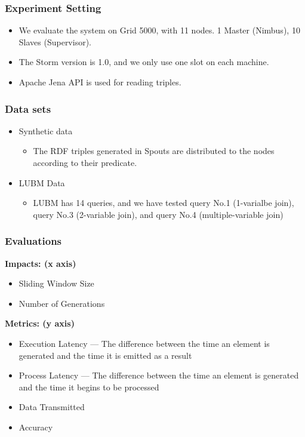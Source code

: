 \begin{frame}
\frametitle{Experiment Setting}
\begin{itemize}
\item We evaluate the system on Grid 5000, with 11 nodes. 1 Master (Nimbus), 10 Slaves (Supervisor). 

\item The Storm version is 1.0, and we only use one slot on each machine.

\item Apache Jena API is used for reading triples.
\end{itemize}

\end{frame}

\begin{frame}
\frametitle{Data sets}
\begin{itemize}
\item Synthetic data
\begin{itemize}
\item The RDF triples generated in Spouts are distributed to the nodes according to their predicate. 
\end{itemize}
\item LUBM Data 
\begin{itemize}
\item LUBM has 14 queries, and we have tested query No.1 (1-varialbe join), query No.3 (2-variable join), and query No.4 (multiple-variable join)
\end{itemize}
\end{itemize}
\end{frame}

\begin{frame}
\frametitle{Evaluations}
\textbf{Impacts: (x axis)}
\begin{itemize}
\item Sliding Window Size
\item Number of Generations
\end{itemize}
\textbf{Metrics: (y axis)}
\begin{itemize}
\item Execution Latency --- The difference between the time an element is generated and the time it is emitted as a result
\item Process Latency --- The difference between the time an element is generated and the time it begins to be processed
\item Data Transmitted
\item Accuracy
\end{itemize}
\end{frame}

